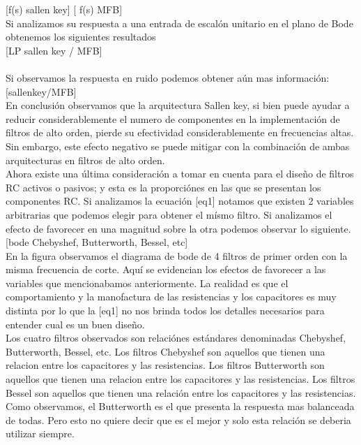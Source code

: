 [f(s) sallen key] [ f(s) MFB]\\

Si analizamos su respuesta a una entrada de escalón unitario en el plano de Bode obtenemos los siguientes resultados\\

[LP sallen key / MFB]\\
[HP Sallen key/ MFB]\\

Si observamos la respuesta en ruido podemos obtener aún mas información:\\

[sallenkey/MFB]\\

En conclusión observamos que la arquitectura Sallen key, si bien puede ayudar a reducir considerablemente el numero de componentes en la implementación de filtros de alto orden, pierde su efectividad considerablemente en frecuencias altas. Sin embargo, este efecto negativo se puede mitigar con la combinación de ambas arquitecturas en filtros de alto orden.\\

Ahora existe una última consideración a tomar en cuenta para el diseño de filtros RC activos o pasivos; y esta es la proporciónes en las que se presentan los componentes RC. Si analizamos la ecuación [eq1] notamos que existen 2 variables arbitrarias que podemos elegir para obtener el mísmo filtro. Si analizamos el efecto de favorecer en una magnitud sobre la otra podemos observar lo siguiente.\\

[bode Chebyshef, Butterworth, Bessel, etc]\\

En la figura observamos el diagrama de bode de 4 filtros de primer orden con la misma frecuencia de corte. Aquí se evidencian los efectos de favorecer a las variables que mencionabamos anteriormente. La realidad es que el comportamiento y la manofactura de las resistencias y los capacitores es muy distinta por lo que la [eq1] no nos brinda todos los detalles necesarios para entender cual es un buen diseño.\\

Los cuatro filtros observados son relaciónes estándares denominadas Chebyshef, Butterworth, Bessel, etc. Los filtros Chebyshef son aquellos que tienen una relacion entre los capacitores y las resistencias. Los filtros Butterworth son aquellos que tienen una relacion entre los capacitores y las resistencias. Los filtros Bessel son aquellos que tienen una relación entre los capacitores y las resistencias. Como observamos, el Butterworth es el que presenta la respuesta mas balanceada de todas. Pero esto no quiere decir que es el mejor y solo esta relación se deberia utilizar siempre.\\

